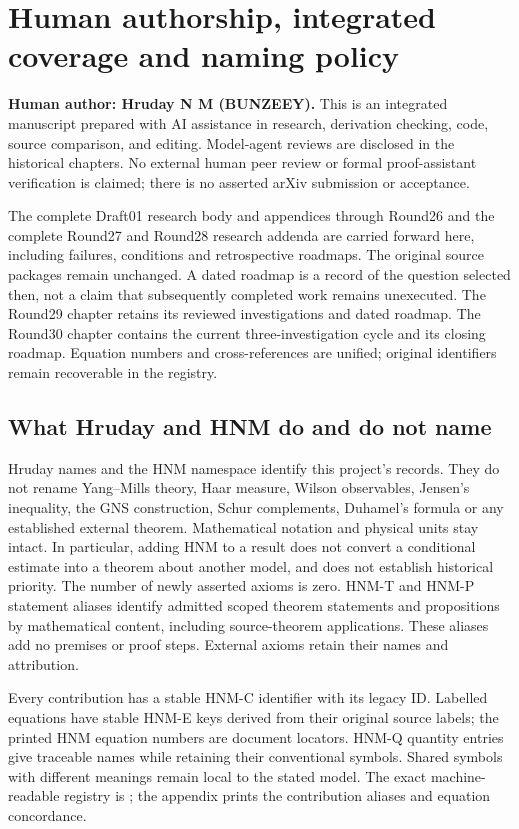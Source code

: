 \section{Human authorship, integrated coverage and naming policy}
\label{sec:editorial-front}
\textbf{Human author: Hruday N M (BUNZEEY).} This is an integrated manuscript prepared with AI assistance in research, derivation checking, code, source comparison, and editing. Model-agent reviews are disclosed in the historical chapters. No external human peer review or formal proof-assistant verification is claimed; there is no asserted arXiv submission or acceptance.

The complete Draft01 research body and appendices through Round26 and the complete Round27 and Round28 research addenda are carried forward here, including failures, conditions and retrospective roadmaps. The original source packages remain unchanged. A dated roadmap is a record of the question selected then, not a claim that subsequently completed work remains unexecuted. The Round29 chapter retains its reviewed investigations and dated roadmap. The Round30 chapter contains the current three-investigation cycle and its closing roadmap. Equation numbers and cross-references are unified; original identifiers remain recoverable in the registry.

\subsection{What Hruday and HNM do and do not name}
Hruday names and the HNM namespace identify this project's records. They do not rename Yang--Mills theory, Haar measure, Wilson observables, Jensen's inequality, the GNS construction, Schur complements, Duhamel's formula or any established external theorem. Mathematical notation and physical units stay intact. In particular, adding HNM to a result does not convert a conditional estimate into a theorem about another model, and does not establish historical priority. The number of newly asserted axioms is zero. HNM-T and HNM-P statement aliases identify admitted scoped theorem statements and propositions by mathematical content, including source-theorem applications. These aliases add no premises or proof steps. External axioms retain their names and attribution.

Every contribution has a stable HNM-C identifier with its legacy ID. Labelled equations have stable HNM-E keys derived from their original source labels; the printed HNM equation numbers are document locators. HNM-Q quantity entries give traceable names while retaining their conventional symbols. Shared symbols with different meanings remain local to the stated model. The exact machine-readable registry is ; the appendix prints the contribution aliases and equation concordance.


